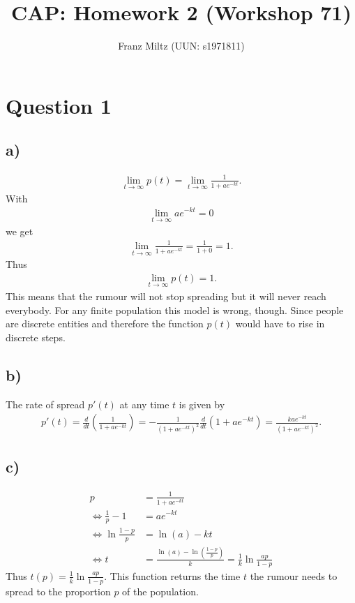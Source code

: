 \documentclass{article}
\title{CAP: Homework 2 (Workshop 71)}
\author{Franz Miltz (UUN: s1971811)}
\begin{document}
\maketitle
\section*{Question 1}
\subsection*{a)}
\begin{align*}
  \lim_{t\to\infty} p(t) = \lim_{t\to\infty} \frac{1}{1+ae^{-kt}}.
\end{align*}
With
\begin{align*}
  \lim_{t\to\infty} ae^{-kt} = 0
\end{align*}
we get
\begin{align*}
  \lim_{t\to\infty}\frac{1}{1+ae^{-kt}}=\frac{1}{1+0}=1.
\end{align*}
Thus
\begin{align*}
  \lim_{t\to\infty}p(t)=1.
\end{align*}
This means that the rumour will not stop spreading but it will never reach everybody.
For any finite population this model is wrong, though.
Since people are discrete entities and therefore the function $p(t)$ would have to rise in discrete steps.
\subsection*{b)}
The rate of spread $p'(t)$ at any time $t$ is given by
\begin{align*}
  p'(t)=\frac{d}{dt}\left(\frac{1}{1+ae^{-kt}}\right)=-\frac{1}{(1+ae^{-kt})^2}\frac{d}{dt}(1+ae^{-kt})
  =\frac{kae^{-kt}}{(1+ae^{-kt})^2}.
\end{align*}
\subsection*{c)}
\begin{align*}
  p                                 & =\frac{1}{1+ae^{-kt}}                                              \\
  \Leftrightarrow \frac{1}{p}-1     & =ae^{-kt}                                                          \\
  \Leftrightarrow \ln \frac{1-p}{p} & = \ln(a) -kt                                                       \\
  \Leftrightarrow t                 & = \frac{\ln(a)-\ln(\frac{1-p}{p})}{k}=\frac{1}{k}\ln\frac{ap}{1-p}
\end{align*}
Thus $t(p)=\frac{1}{k}\ln \frac{ap}{1-p}$. This function returns the time $t$ the rumour needs to spread to the proportion $p$ of the population.
\end{document}
